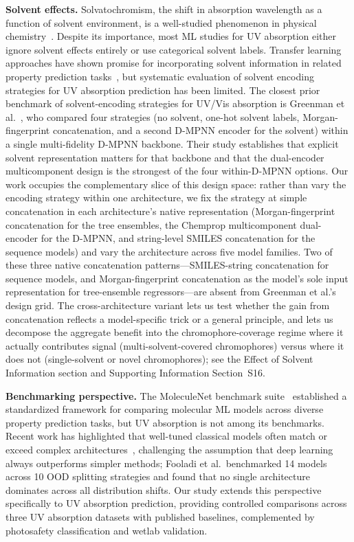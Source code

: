 \documentclass[journal=jcisd8,manuscript=article]{achemso}
\newcommand{\added}[1]{{\color{addedblue}#1}}
\newcommand{\removed}[1]{{\color{removedred}#1}}
\begin{document}
\textbf{Solvent effects.}
Solvatochromism, the shift in absorption wavelength as a function of solvent environment, is a well-studied phenomenon in physical chemistry~\cite{reichardt2011solvents}.
Despite its importance, most ML studies for UV absorption either ignore solvent effects entirely or use categorical solvent labels.
Transfer learning approaches have shown promise for incorporating solvent information in related property prediction tasks~\cite{vermeire2021transfer}\removed{, but systematic evaluation of solvent encoding strategies for UV absorption prediction has been limited}.\added{ The closest prior benchmark of solvent-encoding strategies for UV/Vis absorption is Greenman et al.~\cite{greenman2022multifidelity}, who compared four strategies (no solvent, one-hot solvent labels, Morgan-fingerprint concatenation, and a second D-MPNN encoder for the solvent) within a single multi-fidelity D-MPNN backbone. Their study establishes that explicit solvent representation matters for that backbone and that the dual-encoder multicomponent design is the strongest of the four within-D-MPNN options. Our work occupies the complementary slice of this design space: rather than vary the encoding strategy within one architecture, we fix the strategy at simple concatenation in each architecture's native representation (Morgan-fingerprint concatenation for the tree ensembles, the Chemprop multicomponent dual-encoder for the D-MPNN, and string-level SMILES concatenation for the sequence models) and vary the architecture across five model families. Two of these three native concatenation patterns---SMILES-string concatenation for sequence models, and Morgan-fingerprint concatenation as the model's sole input representation for tree-ensemble regressors---are absent from Greenman et al.'s design grid. The cross-architecture variant lets us test whether the gain from concatenation reflects a model-specific trick or a general principle, and lets us decompose the aggregate benefit into the chromophore-coverage regime where it actually contributes signal (multi-solvent-covered chromophores) versus where it does not (single-solvent or novel chromophores); see the Effect of Solvent Information section and Supporting Information Section~S16.}

\textbf{Benchmarking perspective.}
The MoleculeNet benchmark suite~\cite{wuMoleculeNet2018} established a standardized framework for comparing molecular ML models across diverse property prediction tasks, but UV absorption is not among its benchmarks.
Recent work has highlighted that well-tuned classical models often match or exceed complex architectures~\cite{panapitiya2022evaluation, walters2021applications, fooladi2025evaluating}, challenging the assumption that deep learning always outperforms simpler methods; Fooladi et al.\ benchmarked 14 models across 10 OOD splitting strategies and found that no single architecture dominates across all distribution shifts.
Our study extends this perspective specifically to UV absorption prediction, providing controlled comparisons across three UV absorption datasets with published baselines, complemented by photosafety classification and wetlab validation.
\end{document}
